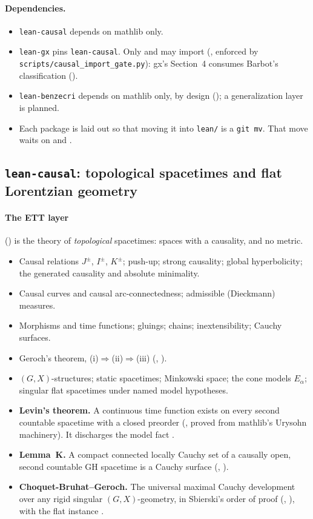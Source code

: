 \paragraph{Dependencies.}
\begin{itemize}
\item \texttt{lean-causal} depends on mathlib only.
\item \texttt{lean-gx} pins \texttt{lean-causal}. Only  and  may
  import  (, enforced by \texttt{scripts/causal\_import\_gate.py}): gx's
  Section~4 consumes Barbot's classification ().
\item \texttt{lean-benzecri} depends on mathlib only, by design (); a generalization
  layer is planned.
\item Each package is laid out so that moving it into \texttt{lean/} is a \texttt{git mv}. That
  move waits on  and .
\end{itemize}

\subsection{\texttt{lean-causal}: topological spacetimes and flat Lorentzian geometry}

\paragraph{The ETT layer} () is the theory of \emph{topological} spacetimes:
spaces with a causality, and no metric.
\begin{itemize}
\item Causal relations $J^\pm$, $I^\pm$, $K^\pm$; push-up; strong causality; global
  hyperbolicity; the generated causality and absolute minimality.
\item Causal curves and causal arc-connectedness; admissible (Dieckmann) measures.
\item Morphisms and time functions; gluings; chains; inextensibility; Cauchy surfaces.
\item Geroch's theorem, (i)$\Rightarrow$(ii)$\Rightarrow$(iii) (,
  ).
\item $(G,X)$-structures; static spacetimes; Minkowski space; the cone models $E_\alpha$;
  singular flat spacetimes under named model hypotheses.
\item \textbf{Levin's theorem.} A continuous time function exists on every second countable
  spacetime with a closed preorder (, proved from mathlib's Urysohn
  machinery). It discharges the model fact .
\item \textbf{Lemma~K.} A compact connected locally Cauchy set of a causally open, second
  countable GH spacetime is a Cauchy surface
  (, ).
\item \textbf{Choquet-Bruhat--Geroch.} The universal maximal Cauchy development over any rigid
  singular $(G,X)$-geometry, in Sbierski's order of proof (,
  ), with the flat instance .
\end{itemize}

